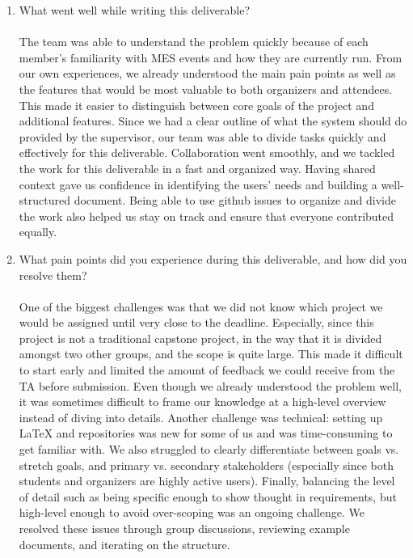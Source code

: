 \documentclass{article}
\begin{document}
\begin{enumerate}
    \item What went well while writing this deliverable?
    \\
    \\The team was able to understand the problem quickly because of each member's familiarity with MES events and how they are currently run.
     From our own experiences, we already understood the main pain points as well as the features that would be most valuable
     to both organizers and attendees. This made it easier to distinguish between core goals of the project and additional features. Since we
     had a clear outline of what the system should do provided by the supervisor, our team was able to divide tasks quickly and effectively
      for this deliverable. Collaboration went smoothly, and we tackled the work for this deliverable in a fast and organized way. Having shared context
      gave us confidence in identifying the users' needs and building a well-structured document. Being able to use github issues to organize and divide
      the work also helped us stay on track and ensure that everyone contributed equally.
    \item What pain points did you experience during this deliverable, and how
    did you resolve them?
    \\
    \\One of the biggest challenges was that we did not know which project we would be assigned until very close to the deadline.
     Especially, since this project is not a traditional capstone project, in the way that it is divided amongst two other groups, and the scope is quite large.
     This made it difficult to start early and limited the amount of feedback we could receive from the TA before submission. Even
      though we already understood the problem well, it was sometimes difficult to frame our knowledge at a high-level overview
     instead of diving into details. Another challenge was technical: setting up LaTeX and repositories was new for some of us and
      was time-consuming to get familiar with. We also struggled to clearly differentiate between goals vs. stretch goals, and 
      primary vs. secondary stakeholders (especially since both students and organizers are highly active users). Finally, balancing
     the level of detail such as being specific enough to show thought in requirements, but high-level enough to avoid over-scoping was an ongoing
      challenge. We resolved these issues through group discussions, reviewing example documents, and iterating on the structure.


\end{enumerate}
\end{document}
